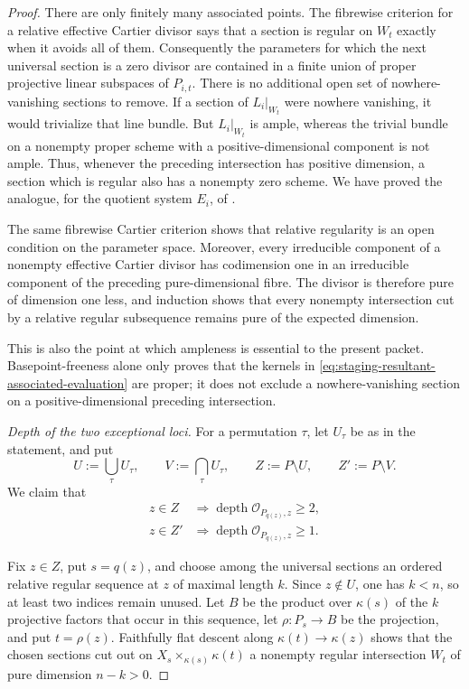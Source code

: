\begin{proof}
There are only finitely many associated points.  The fibrewise criterion
for a relative effective Cartier divisor says that a section is regular on
\(W_t\) exactly when it avoids all of them.  Consequently the parameters
for which the next universal section is a zero divisor are contained in a
finite union of proper projective linear subspaces of \(P_{i,t}\).
There is no additional open set of nowhere-vanishing sections to remove.
If a section of \(L_i|_{W_t}\) were nowhere vanishing, it would trivialize
that line bundle.  But \(L_i|_{W_t}\) is ample, whereas the trivial bundle
on a nonempty proper scheme with a positive-dimensional component is not
ample.  Thus, whenever the preceding intersection has positive dimension,
a section which is regular also has a nonempty zero scheme.  We have proved
the analogue, for the quotient system \(E_i\), of
\cite[Lemmas~2.4.1 and~2.4.3]{Ducrot05Cube}.

The same fibrewise Cartier criterion shows that relative regularity is an
open condition on the parameter space.  Moreover, every irreducible
component of a nonempty effective Cartier divisor has codimension one in an
irreducible component of the preceding pure-dimensional fibre.  The divisor
is therefore pure of dimension one less, and induction shows that every
nonempty intersection cut by a relative regular subsequence remains pure of
the expected dimension.

This is also the point at which ampleness is essential to the present
packet.  Basepoint-freeness alone only proves that the kernels in
\eqref{eq:staging-resultant-associated-evaluation} are proper; it does not
exclude a nowhere-vanishing section on a positive-dimensional preceding
intersection.

\medskip
\noindent\emph{Depth of the two exceptional loci.}
For a permutation \(\tau\), let \(U_\tau\) be as in the statement, and put
\[
 U:=\bigcup_\tau U_\tau,
 \qquad
 V:=\bigcap_\tau U_\tau,
 \qquad
 Z:=P\setminus U,
 \qquad
 Z':=P\setminus V .
\]
We claim that
\begin{equation}\label{eq:staging-resultant-two-depth-bounds}
 \begin{aligned}
 z\in Z
 &\Longrightarrow
 \operatorname{depth}\mathcal O_{P_{q(z)},z}\geq2,\\
 z\in Z'
 &\Longrightarrow
 \operatorname{depth}\mathcal O_{P_{q(z)},z}\geq1.
 \end{aligned}
\end{equation}

Fix \(z\in Z\), put \(s=q(z)\), and choose among the universal sections an
ordered relative regular sequence at \(z\) of maximal length \(k\).  Since
\(z\notin U\), one has \(k<n\), so at least two indices remain unused.
Let \(B\) be the product over \(\kappa(s)\) of the \(k\) projective factors
that occur in this sequence, let \(\rho\colon P_s\to B\) be the projection,
and put \(t=\rho(z)\).  Faithfully flat descent along
\(\kappa(t)\to\kappa(z)\) shows that the chosen sections cut out on
\(X_s\times_{\kappa(s)}\kappa(t)\) a nonempty regular intersection \(W_t\)
of pure dimension \(n-k>0\).


\end{proof}
